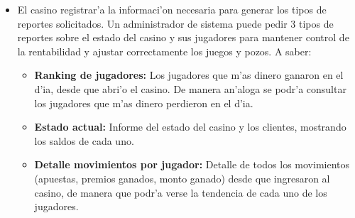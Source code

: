 \begin{itemize}



\item {} 
 
    El casino registrar'a la informaci'on necesaria para generar los tipos de reportes solicitados.
    Un administrador de sistema puede pedir 3 tipos de reportes sobre el estado del casino y sus jugadores para mantener control de la rentabilidad y ajustar correctamente los juegos y pozos. A saber:
    \begin{itemize}
        \item {\bf Ranking de jugadores:} Los jugadores que m'as dinero ganaron en el d'ia, desde que abri'o el casino. De manera an'aloga se podr'a consultar los jugadores que m'as dinero perdieron en el d'ia.
        
        \item {\bf Estado actual:} Informe del estado del casino y los clientes, mostrando los saldos de cada uno.
        
        \item {\bf Detalle movimientos por jugador:} Detalle de todos los movimientos (apuestas, premios ganados, monto ganado) desde que ingresaron al casino, de manera que podr'a verse la tendencia de cada uno de los jugadores.
    \end{itemize}


\end{itemize}
